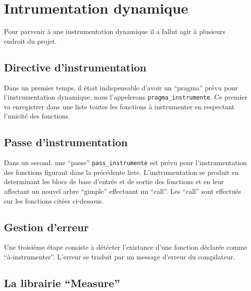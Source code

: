 %

\section{Intrumentation dynamique}

Pour parvenir à une instrumentation dynamique il a fallut agir à plusieurs endroit du projet.

\subsection{Directive d'instrumentation}

Dans un premier temps, il était indispensable d'avoir un ``pragma'' prévu pour l'instrumentation dynamique, nous l'appelerons \verb#pragma_instrumente#. Ce premier va enregistrer dans une liste toutes les fonctions à instrumenter en respectant l'unicité des fonctions.

\subsection{Passe d'instrumentation}

Dans un second, une ``passe'' \verb#pass_instrumente# est prévu pour l'instrumentation des fonctions figurant dans la précédente liste. L'instrumentation se produit en determinant les blocs de base d'entrée et de sortie des fonctions et en leur affectant un nouvel arbre ``gimple'' effectuant un ``call''. Les ``call'' sont effectués sur les fonctions citées ci-dessous.

\subsection{Gestion d'erreur}

Une troisième étape consiste à détécter l'existance d'une fonction déclarée comme ``à-instrumenter''. L'erreur se traduit par un message d'erreur du compilateur.

\subsection{La librairie ``Measure''}

